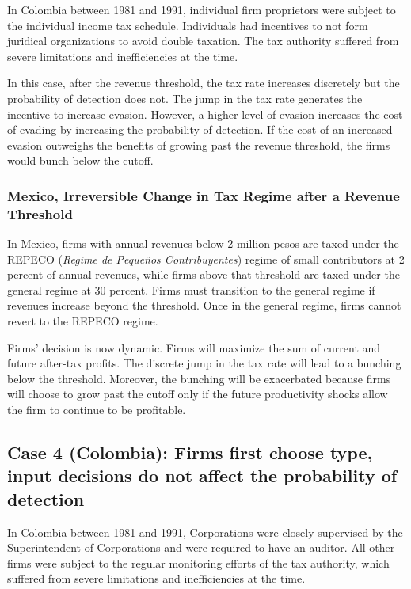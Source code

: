 \documentclass[
  12pt]{article}
\theoremstyle{definition}
\theoremstyle{remark}
\begin{document}
In Colombia between 1981 and 1991, individual firm proprietors were
subject to the individual income tax schedule. Individuals had
incentives to not form juridical organizations to avoid double taxation.
The tax authority suffered from severe limitations and inefficiencies at
the time.

In this case, after the revenue threshold, the tax rate increases
discretely but the probability of detection does not. The jump in the
tax rate generates the incentive to increase evasion. However, a higher
level of evasion increases the cost of evading by increasing the
probability of detection. If the cost of an increased evasion outweighs
the benefits of growing past the revenue threshold, the firms would
bunch below the cutoff.

\subsubsection{Mexico, Irreversible Change in Tax Regime after a Revenue
Threshold}\label{mexico-irreversible-change-in-tax-regime-after-a-revenue-threshold}

In Mexico, firms with annual revenues below 2 million pesos are taxed
under the REPECO (\emph{Regime de Pequeños Contribuyentes}) regime of
small contributors at 2 percent of annual revenues, while firms above
that threshold are taxed under the general regime at 30 percent. Firms
must transition to the general regime if revenues increase beyond the
threshold. Once in the general regime, firms cannot revert to the REPECO
regime.

Firms' decision is now dynamic. Firms will maximize the sum of current
and future after-tax profits. The discrete jump in the tax rate will
lead to a bunching below the threshold. Moreover, the bunching will be
exacerbated because firms will choose to grow past the cutoff only if
the future productivity shocks allow the firm to continue to be
profitable.

\subsection{Case 4 (Colombia): Firms first choose type, input decisions
do not affect the probability of
detection}\label{case-4-colombia-firms-first-choose-type-input-decisions-do-not-affect-the-probability-of-detection}

In Colombia between 1981 and 1991, Corporations were closely supervised
by the Superintendent of Corporations and were required to have an
auditor. All other firms were subject to the regular monitoring efforts
of the tax authority, which suffered from severe limitations and
inefficiencies at the time.
\end{document}
